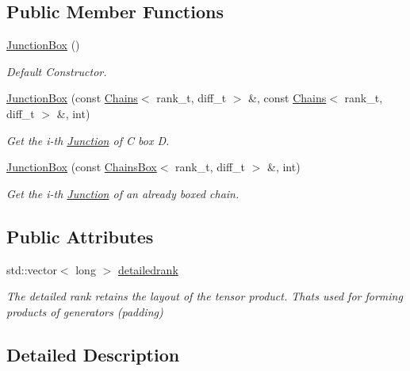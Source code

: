 \subsection*{Public Member Functions}
\begin{DoxyCompactItemize}
\item 
\hyperlink{classMackey_1_1JunctionBox_a6cc2a3bbcbf3e89d7079856b5d16cba4}{Junction\+Box} ()
\begin{DoxyCompactList}\small\item\em Default Constructor. \end{DoxyCompactList}\item 
\hyperlink{classMackey_1_1JunctionBox_ad1847b0ee8aaa343521366f2ff85b7bf}{Junction\+Box} (const \hyperlink{classMackey_1_1Chains}{Chains}$<$ rank\+\_\+t, diff\+\_\+t $>$ \&, const \hyperlink{classMackey_1_1Chains}{Chains}$<$ rank\+\_\+t, diff\+\_\+t $>$ \&, int)
\begin{DoxyCompactList}\small\item\em Get the i-\/th \hyperlink{classMackey_1_1Junction}{Junction} of C box D. \end{DoxyCompactList}\item 
\hyperlink{classMackey_1_1JunctionBox_abd78f76fdc5f83906046e44c6901c54d}{Junction\+Box} (const \hyperlink{classMackey_1_1ChainsBox}{Chains\+Box}$<$ rank\+\_\+t, diff\+\_\+t $>$ \&, int)
\begin{DoxyCompactList}\small\item\em Get the i-\/th \hyperlink{classMackey_1_1Junction}{Junction} of an already boxed chain. \end{DoxyCompactList}\end{DoxyCompactItemize}
\subsection*{Public Attributes}
\begin{DoxyCompactItemize}
\item 
std\+::vector$<$ long $>$ \hyperlink{classMackey_1_1JunctionBox_a433ab2c79159bd2bce8d0fca0ab96be2}{detailedrank}
\begin{DoxyCompactList}\small\item\em The detailed rank retains the layout of the tensor product. That\textquotesingle{}s used for forming products of generators (padding) \end{DoxyCompactList}\end{DoxyCompactItemize}


\subsection{Detailed Description}

